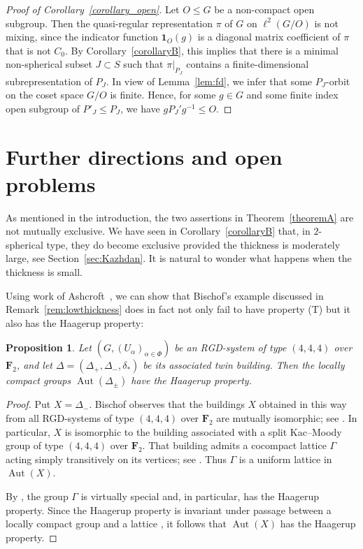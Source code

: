 \documentclass[12pt,a4paper]{amsproc}
\newtheorem{proposition}[theorem]{Proposition}
\theoremstyle{definition}
\DeclareMathOperator{\Aut}{Aut}
\newcommand{\one}{\mathbf 1}
\begin{document}
	
\begin{proof}[Proof of Corollary~\ref{corollary_open}]
Let $O \leq G$ be a non-compact open subgroup.  
 Then the quasi-regular representation    $\pi$   of $G$ on $\ell^2(G/O)$ is not mixing, since the indicator function $\one_O(g)$ is a diagonal matrix coefficient of $\pi$ that is not $C_0$. By Corollary~\ref{corollaryB}, this implies that there is a minimal non-spherical subset $J \subset S$ such that $\pi|_{P_J}$ contains a finite-dimensional subrepresentation of $P_J$. In view of Lemma~\ref{lem:fd}, we infer that some $P_J$-orbit on the coset space $G/O$ is finite. Hence, for some $g \in G$ and some   finite index open  subgroup of $P'_J \leq P_J$, we have $gP_J' g^{-1} \leq O$. 
\end{proof}

\section{Further directions and open problems} \label{sec:outlook}

As mentioned in the introduction, the two assertions in  Theorem~\ref{theoremA} are not mutually exclusive. We have seen in Corollary~\ref{corollaryB} that, in $2$-spherical type, they do become exclusive provided the thickness is moderately large, see Section~\ref{sec:Kazhdan}. It is natural to wonder what happens when the thickness is small.
 
Using work of Ashcroft~\cite{Ashcroft}, we can show that Bischof's example discussed   in Remark~\ref{rem:lowthickness} does in fact not only fail to have property (T) but it also has the Haagerup property:

\begin{proposition}\label{prop:haagerup-444}
Let
$
(G,(U_\alpha)_{\alpha\in\Phi})
$
be an RGD-system of type $(4,4,4)$ over $\mathbf F_2$, and let
$
\Delta=(\Delta_+,\Delta_-,\delta_*)
$
be its associated twin building. Then the locally compact groups
$\Aut(\Delta_\pm)$ have the Haagerup property.
\end{proposition}
\begin{proof}
Put $X=\Delta_-$. Bischof observes
that the buildings $X$ obtained in this way from all RGD-systems of
type $(4,4,4)$ over $\mathbf F_2$ are mutually isomorphic; see
\cite[Remark~1(b)]{BischofUncountably}. In particular, $X$ is
isomorphic to the building associated with a split Kac--Moody group
of type $(4,4,4)$ over $\mathbf F_2$. That building admits a cocompact lattice $\Gamma$ acting simply transitively on its vertices;
see \cite[p.~102]{CKV}. Thus $\Gamma$ is a uniform lattice in
$\Aut(X)$.

By \cite[Corollary~B]{Ashcroft}, the group $\Gamma$ is virtually special
and, in particular, has the Haagerup property. Since the Haagerup property
is invariant under passage between a locally compact group and a lattice
\cite[Proposition~6.1.5]{CCJJV}, it follows that $\Aut(X)$ has the Haagerup
property.
\end{proof}
\end{document}
